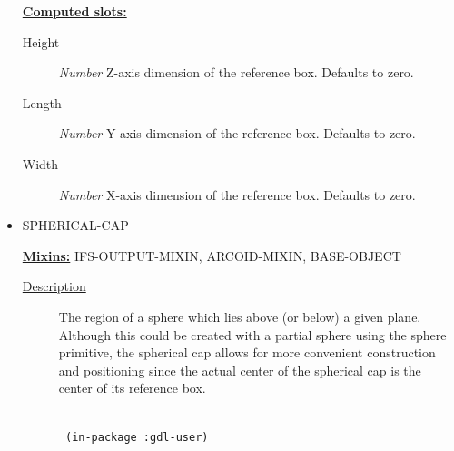 \documentclass [11pt]{book}
\begin{document}
\begin{itemize}
\begin{description}
\end{description}






\textbf{
\underline{Computed slots:}}

\begin{description}

\item [Height]
\emph{Number} Z-axis dimension of the reference box. Defaults to zero.


\item [Length]
\emph{Number} Y-axis dimension of the reference box. Defaults to zero.


\item [Width]
\emph{Number} X-axis dimension of the reference box. Defaults to zero.


\end{description}







\item {}SPHERICAL-CAP


\textbf{
\underline{Mixins:}} IFS-OUTPUT-MIXIN, ARCOID-MIXIN, BASE-OBJECT





\begin{description}

\item [
\underline{Description}]


The region of a sphere which lies above (or below) a given plane. Although this
could be created with a partial sphere using the sphere primitive, the spherical cap allows for more convenient
construction and positioning since the actual center of the spherical cap is the center of its reference box.



\end{description}




\begin{figure}
\begin{lrbox}{\boxedverb}
\begin{minipage}{\linewidth}
{\small

\begin{verbatim}
  
 (in-package :gdl-user)


\end{verbatim}}
\end{minipage}
\end{lrbox}
\end{figure}
\end{itemize}
\end{document}
